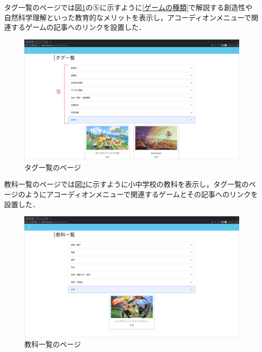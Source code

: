 タグ一覧のページでは図\ref{fig:タグページ}の⑤に示すように\ref{ゲームの種類}で解説する創造性や自然科学理解といった教育的なメリットを表示し，アコーディオンメニューで関連するゲームの記事へのリンクを設置した．

\begin{figure}[H]
\begin{center}
 \includegraphics[keepaspectratio, scale=0.15]{PDF/tagpage.pdf}
\end{center}
 \caption{タグ一覧のページ}
 \label{fig:タグページ}
\end{figure}

教科一覧のページでは図\ref{fig:教科ページ}に示すように小中学校の教科を表示し，タグ一覧のページのようにアコーディオンメニューで関連するゲームとその記事へのリンクを設置した．

\begin{figure}[H]
\begin{center}
 \includegraphics[keepaspectratio, scale=0.15]{PDF/subpage.pdf}
\end{center}
 \caption{教科一覧のページ}
 \label{fig:教科ページ}
\end{figure}

